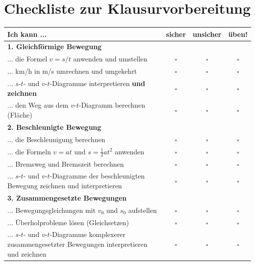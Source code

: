 \documentclass[11pt, a4paper]{article}
\begin{document}
\newpage


\section{Checkliste zur Klausurvorbereitung}

\begin{center}
\renewcommand{\arraystretch}{1.6}
\begin{tabular}{|p{10cm}|c|c|c|}
\hline
\textbf{Ich kann ...} & \textbf{sicher} & \textbf{unsicher} & \textbf{üben!} \\
\hline
\multicolumn{4}{|l|}{\textbf{1. Gleichförmige Bewegung}} \\
\hline
... die Formel $v = s/t$ anwenden und umstellen & $\square$ & $\square$ & $\square$ \\
\hline
... km/h in m/s umrechnen und umgekehrt & $\square$ & $\square$ & $\square$ \\
\hline
... $s$-$t$- und $v$-$t$-Diagramme interpretieren \textbf{und zeichnen} & $\square$ & $\square$ & $\square$ \\
\hline
... den Weg aus dem $v$-$t$-Diagramm berechnen (Fläche) & $\square$ & $\square$ & $\square$ \\
\hline
\multicolumn{4}{|l|}{\textbf{2. Beschleunigte Bewegung}} \\
\hline
... die Beschleunigung berechnen & $\square$ & $\square$ & $\square$ \\
\hline
... die Formeln $v = at$ und $s = \frac{1}{2}at^2$ anwenden & $\square$ & $\square$ & $\square$ \\
\hline
... Bremsweg und Bremszeit berechnen & $\square$ & $\square$ & $\square$ \\
\hline
... $s$-$t$- und $v$-$t$-Diagramme der beschleunigten Bewegung zeichnen und interpretieren & $\square$ & $\square$ & $\square$ \\
\hline
\multicolumn{4}{|l|}{\textbf{3. Zusammengesetzte Bewegungen}} \\
\hline
... Bewegungsgleichungen mit $v_0$ und $s_0$ aufstellen & $\square$ & $\square$ & $\square$ \\
\hline
... Überholprobleme lösen (Gleichsetzen) & $\square$ & $\square$ & $\square$ \\
\hline
... $s$-$t$- und $v$-$t$-Diagramme komplexerer zusammengesetzter Bewegungen interpretieren und zeichnen & $\square$ & $\square$ & $\square$ \\

\end{tabular}
\end{center}
\end{document}
